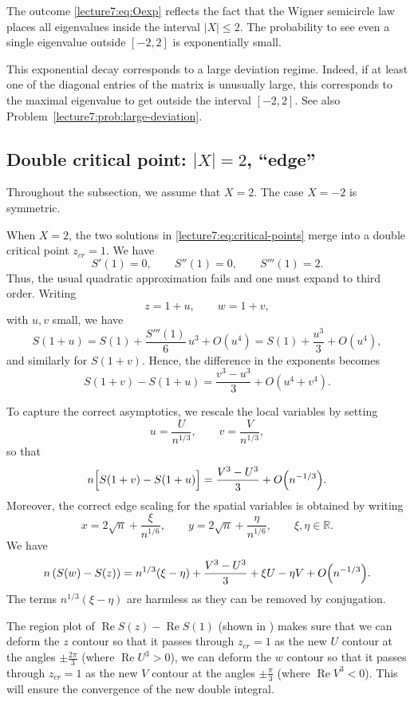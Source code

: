 \documentclass[letterpaper,11pt,oneside,reqno]{book}
\numberwithin{equation}{chapter}  %
\theoremstyle{definition}
\begin{document}
The outcome \eqref{lecture7:eq:Oexp} reflects the fact that the
Wigner semicircle law places all eigenvalues inside the
interval \(\lvert X\rvert \le 2\).
The probability to see even a single eigenvalue outside $[-2,2]$
is exponentially small.

This exponential decay corresponds to a large deviation regime.
Indeed, if at least one of the diagonal entries of the matrix
is unusually large, this corresponds to
the maximal eigenvalue to get outside the interval \([-2,2]\).
See also Problem~\ref{lecture7:prob:large-deviation}.


\subsection{Double critical point: $|X|=2$, ``edge''}
\label{lecture7:sub:double-critical-points}

Throughout the subsection, we assume that $X=2$. The case $X=-2$ is symmetric.

When \(X=2\), the two solutions in \eqref{lecture7:eq:critical-points} merge into a double critical point
$z_{cr}=1$.
We have
\[
S'(1)=0,\qquad S''(1)=0,\qquad S'''(1)=2.
\]
Thus, the usual quadratic approximation fails and one must expand to third order. Writing
\[
z=1+u,\qquad w=1+v,
\]
with \(u,v\) small, we have
\[
S(1+u)=S(1)+\frac{S'''(1)}{6}\,u^3+O(u^4)
=S(1)+\frac{u^3}{3}+O(u^4),
\]
and similarly for \(S(1+v)\). Hence, the difference in the exponents becomes
\[
S(1+v)-S(1+u)=\frac{v^3-u^3}{3}+O(u^4+v^4).
\]

To capture the correct asymptotics, we rescale the local variables by setting
\[
u=\frac{U}{n^{1/3}},\qquad v=\frac{V}{n^{1/3}},
\]
so that
\[
n\Bigl[S(1+v)-S(1+u)\Bigr]=\frac{V^3-U^3}{3}+O\Bigl(n^{-1/3}\Bigr).
\]
Moreover, the correct edge scaling for the spatial variables is obtained by writing
\[
x=2\sqrt{n}+\frac{\xi}{n^{1/6}},\qquad y=2\sqrt{n}+\frac{\eta}{n^{1/6}},\qquad \xi,\eta\in\mathbb{R}.
\]
We have
\begin{equation*}
	n\left( S(w)-S(z) \right)=n^{1/3}(\xi-\eta)+
	\frac{V^3-U^3}{3}+\xi U-\eta V+O\Bigl(n^{-1/3}\Bigr).
\end{equation*}
The terms $n^{1/3}(\xi-\eta)$ are harmless as they can be removed
by conjugation.

The region plot of $\operatorname{Re}S(z)-\operatorname{Re}S(1)$
(shown in )
makes sure that we can deform the $z$ contour so that it passes through $z_{cr}=1$
as the new $U$ contour at the angles $\pm \frac{2\pi}{3}$ (where $\operatorname{Re}U^3>0$),
we can deform the $w$ contour so that it passes through $z_{cr}=1$
as the new $V$ contour at the angles $\pm \frac{\pi}{3}$ (where $\operatorname{Re}V^3<0$).
This will ensure the convergence of the new double integral.
\end{document}
